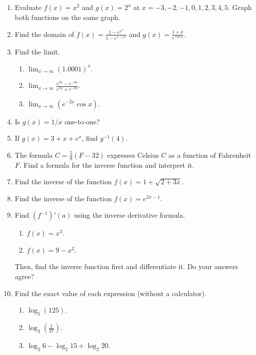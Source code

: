 

\begin{enumerate}

	\item	Evaluate $f(x) = x^2$ and $g(x) = 2^x$ at $x=-3,-2,-1,0,1,2,3,4,5$. Graph both functions on the same graph.

	\item   Find the domain of $\displaystyle f(x) = \frac{ 1 - e^{x^2} }{ 1 - e^{1-x^2} }$ and $\displaystyle g(x) = \frac{ 1+x }{ e^{\cos x} }$.

	\item	Find the limit.
		\begin{enumerate}
			\item $\displaystyle\lim_{ x \rightarrow \infty } (1.0001)^x $.
			\item $\displaystyle\lim_{x \rightarrow \infty} \frac{ e^{3x} - e^{-3x} }{ e^{3x} + e^{-3x} }$.
			\item $\displaystyle \lim_{x \rightarrow \infty} ( e^{-2x} \cos x)$.
		\end{enumerate}

	\item 	Is $g(x) = 1/x$ one-to-one?

	\item 	If $g(x) = 3 +x + e^x$, find $g^{-1}(4)$.

	\newpage

	\item	The formula $C = \frac{5}{9}(F-32)$ expresses Celsius $C$ as a function of Fahrenheit $F$. 
			Find a formula for the inverse function and interpret it.

	\item 	Find the inverse of the function $f(x) = 1 + \sqrt{ 2 + 3x }$.

	\item 	Find the inverse of the function $f(x) = e^{2x-1}$.

	\item 	Find $ (f^{-1})'(a)$ using the inverse derivative formula.
		\begin{enumerate}
			\item $f(x) = x^3$.
			\item $f(x) = 9-x^2$.
		\end{enumerate}
		Then, find the inverse function first and differentiate it. Do your answers agree?


	\item 	Find the exact value of each expression (without a calculator).
		\begin{enumerate}
			\item	$\log_5(125)$.
			\item 	$\displaystyle \log_3\left( \frac{1}{27} \right)$.
			\item	$\log_2 6 - \log_2 15 + \log_2 20$.
		\end{enumerate}
		

\end{enumerate}
